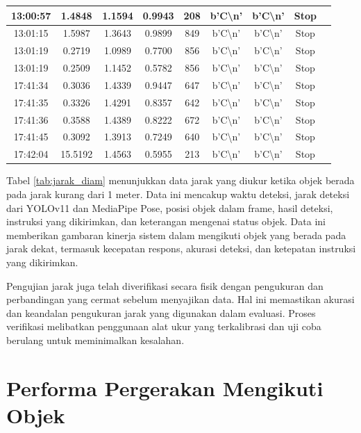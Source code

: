 \begin{table}[H]
\begin{tabular}{|c|c|c|c|c|c|c|c|c|}
    13:00:57 & 1.4848 & 1.1594 & 0.9943 & 208 & b'C\textbackslash n' & b'C\textbackslash n' & Stop \\ \hline
    13:01:15 & 1.5987 & 1.3643 & 0.9899 & 849 & b'C\textbackslash n' & b'C\textbackslash n' & Stop \\ \hline
    13:01:19 & 0.2719 & 1.0989 & 0.7700 & 856 & b'C\textbackslash n' & b'C\textbackslash n' & Stop \\ \hline
    13:01:19 & 0.2509 & 1.1452 & 0.5782 & 856 & b'C\textbackslash n' & b'C\textbackslash n' & Stop \\ \hline
    17:41:34 & 0.3036 & 1.4339 & 0.9447 & 647 & b'C\textbackslash n' & b'C\textbackslash n' & Stop \\ \hline
    17:41:35 & 0.3326 & 1.4291 & 0.8357 & 642 & b'C\textbackslash n' & b'C\textbackslash n' & Stop \\ \hline
    17:41:36 & 0.3588 & 1.4389 & 0.8222 & 672 & b'C\textbackslash n' & b'C\textbackslash n' & Stop \\ \hline
    17:41:45 & 0.3092 & 1.3913 & 0.7249 & 640 & b'C\textbackslash n' & b'C\textbackslash n' & Stop \\ \hline
    17:42:04 & 15.5192 & 1.4563 & 0.5955 & 213 & b'C\textbackslash n' & b'C\textbackslash n' & Stop \\ \hline
    \end{tabular}
    \end{table}

Tabel \ref{tab:jarak_diam} menunjukkan data jarak yang diukur ketika objek berada pada jarak kurang dari 1 meter. Data ini mencakup waktu deteksi, jarak deteksi dari YOLOv11 dan MediaPipe Pose, posisi objek dalam frame, hasil deteksi, instruksi yang dikirimkan, dan keterangan mengenai status objek. Data ini memberikan gambaran kinerja sistem dalam mengikuti objek yang berada pada jarak dekat, termasuk kecepatan respons, akurasi deteksi, dan ketepatan instruksi yang dikirimkan.

Pengujian jarak juga telah diverifikasi secara fisik dengan pengukuran dan perbandingan yang cermat sebelum menyajikan data. Hal ini memastikan akurasi dan keandalan pengukuran jarak yang digunakan dalam evaluasi. Proses verifikasi melibatkan penggunaan alat ukur yang terkalibrasi dan uji coba berulang untuk meminimalkan kesalahan.

\newpage
\section{Performa Pergerakan Mengikuti Objek}
\label{sec:performaakurasiobjek}

